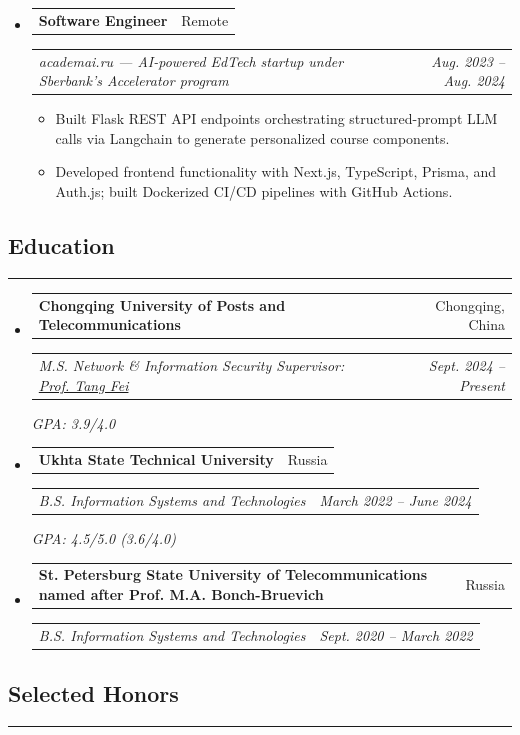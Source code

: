 \documentclass[10.5pt,letterpaper]{article}
\makeatletter
\newcommand{\headerrow}[2]
{\begin{tabular*}{\linewidth}{l@{\extracolsep{\fill}}r}
#1 & #2 \\
\end{tabular*}}
\newcommand{\sectionline}[1]{
\vspace{0.18cm}
\subsection*{\large #1}
\vspace{-0.55em}
\hrule
\vspace{0.25em}
}
\makeatother
\begin{document}
\begin{itemize}[leftmargin=0em, itemsep=0.45em]
    \item
    \headerrow
        {\textbf{Software Engineer}}
        {Remote}
    \headerrow
        {\emph{academai.ru --- AI-powered EdTech startup under Sberbank's Accelerator program}}
        {\emph{Aug. 2023 -- Aug. 2024}}
    \begin{itemize}[leftmargin=1.2em, itemsep=0.05em]
        \renewcommand\labelitemi{$\bullet$}
        \item Built Flask REST API endpoints orchestrating structured-prompt LLM calls via Langchain to generate personalized course components.
        \item Developed frontend functionality with Next.js, TypeScript, Prisma, and Auth.js; built Dockerized CI/CD pipelines with GitHub Actions.
    \end{itemize}

\end{itemize}

\sectionline{Education}

\begin{itemize}[leftmargin=1em, itemsep=0.3em]
    \item
    \headerrow
        {\textbf{Chongqing University of Posts and Telecommunications}}
        {Chongqing, China}
    \headerrow
        {\emph{M.S. Network \& Information Security \quad Supervisor: \href{https://faculty.cqupt.edu.cn/tangfei/en/index.htm}{Prof. Tang Fei}}}
        {\emph{Sept. 2024 -- Present}}
        {\emph{GPA: 3.9/4.0}}

    \item
    \headerrow
        {\textbf{Ukhta State Technical University}}
        {Russia}
    \headerrow
        {\emph{B.S. Information Systems and Technologies}}
        {\emph{March 2022 -- June 2024}}
        {\emph{GPA: 4.5/5.0 (3.6/4.0)}}

    \item
    \headerrow
        {\textbf{St. Petersburg State University of Telecommunications named after Prof. M.A. Bonch-Bruevich}}
        {Russia}
    \headerrow
        {\emph{B.S. Information Systems and Technologies}}
        {\emph{Sept. 2020 -- March 2022}}

\end{itemize}

\sectionline{Selected Honors}
\end{document}
